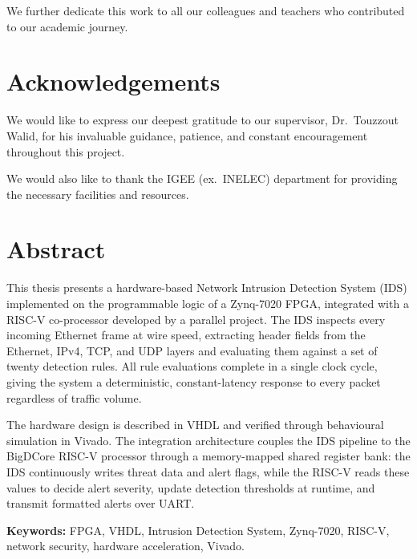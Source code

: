 \documentclass[12pt, a4paper]{report}
\begin{document}
We further dedicate this work to all our colleagues and teachers who contributed to our academic journey.

\clearpage

\chapter*{Acknowledgements}

We would like to express our deepest gratitude to our supervisor, Dr.~Touzzout Walid, for his invaluable guidance, patience, and constant encouragement throughout this project.

We would also like to thank the IGEE (ex.~INELEC) department for providing the necessary facilities and resources.

\clearpage

\chapter*{Abstract}

This thesis presents a hardware-based Network Intrusion Detection System (IDS) implemented on the programmable logic of a Zynq-7020 FPGA, integrated with a RISC-V co-processor developed by a parallel project. The IDS inspects every incoming Ethernet frame at wire speed, extracting header fields from the Ethernet, IPv4, TCP, and UDP layers and evaluating them against a set of twenty detection rules. All rule evaluations complete in a single clock cycle, giving the system a deterministic, constant-latency response to every packet regardless of traffic volume.

The hardware design is described in VHDL and verified through behavioural simulation in Vivado. The integration architecture couples the IDS pipeline to the BigDCore RISC-V processor through a memory-mapped shared register bank: the IDS continuously writes threat data and alert flags, while the RISC-V reads these values to decide alert severity, update detection thresholds at runtime, and transmit formatted alerts over UART.

\textbf{Keywords:} FPGA, VHDL, Intrusion Detection System, Zynq-7020, RISC-V, network security, hardware acceleration, Vivado.

\clearpage

\tableofcontents
\clearpage
\end{document}
